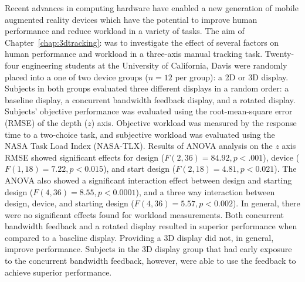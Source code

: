 Recent advances in computing hardware have enabled a new generation of mobile augmented reality devices which have the potential to improve human performance and reduce workload in a variety of tasks.
The aim of Chapter~\ref{chap:3dtracking}:  was to investigate the effect of several factors on human performance and workload in a three-axis manual tracking task.
Twenty-four engineering students at the University of California, Davis were randomly placed into a one of two device groups ($n=12$ per group): a 2D or 3D display.
Subjects in both groups evaluated three different displays in a random order: a baseline display, a concurrent bandwidth feedback display, and a rotated display.
Subjects' objective performance was evaluated using the root-mean-square error (RMSE) of the depth ($z$) axis.
Objective workload was measured by the response time to a two-choice task, and subjective workload was evaluated using the NASA Task Load Index (NASA-TLX).
Results of ANOVA analysis on the $z$ axis RMSE showed significant effects for design ($F(2, 36)=84.92, p<.001$), device ($F(1, 18)=7.22, p<0.015$), and start design ($F(2, 18)=4.81, p<0.021$).
The ANOVA also showed a significant interaction effect between design and starting design ($F(4, 36)=8.55, p<0.0001$), and a three way interaction between design, device, and starting design ($F(4, 36)=5.57, p<0.002$).
In general, there were no significant effects found for workload measurements.
Both concurrent bandwidth feedback and a rotated display resulted in superior performance when compared to a baseline display.
Providing a 3D display did not, in general, improve performance.
Subjects in the 3D display group that had early exposure to the concurrent bandwidth feedback, however, were able to use the feedback to achieve superior performance.

